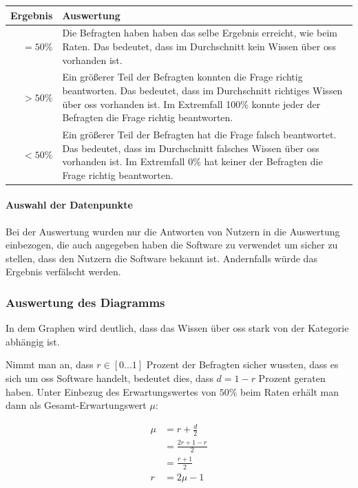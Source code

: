 \documentclass[a4paper]{article}
\begin{document}
                    \begin{tabularx}{\textwidth}{rX}
                        \textbf{Ergebnis} & \textbf{Auswertung} \\\hline
                        $= 50 \%$ & Die Befragten haben haben das selbe Ergebnis erreicht, wie beim Raten. Das bedeutet, dass im Durchschnitt kein Wissen über \gls{oss} vorhanden ist.\\
                        $> 50 \%$ & Ein größerer Teil der Befragten konnten die Frage richtig beantworten. Das bedeutet, dass im Durchschnitt richtiges Wissen über \gls{oss} vorhanden ist. Im Extremfall 100\% konnte jeder der Befragten die Frage richtig beantworten.\\
                        $< 50 \%$ & Ein größerer Teil der Befragten hat die Frage falsch beantwortet. Das bedeutet, dass im Durchschnitt falsches Wissen über \gls{oss} vorhanden ist. Im Extremfall 0\% hat keiner der Befragten die Frage richtig beantworten.  
                    \end{tabularx}
            
                \paragraph{Auswahl der Datenpunkte}
                    Bei der Auswertung wurden nur die Antworten von Nutzern in die Auswertung einbezogen, die auch angegeben haben die Software zu verwendet um sicher zu stellen, dass den Nutzern die Software bekannt ist. Andernfalls würde das Ergebnis verfälscht werden.
                    
            \subsubsection{Auswertung des Diagramms}\label{section:knowledge_analysis}
                In dem Graphen wird deutlich, dass das Wissen über \gls{oss} stark von der Kategorie abhängig ist. %
            
                Nimmt man an, dass $r \in \left[0...1\right]$ Prozent der Befragten sicher wussten, dass es sich um \gls{oss} Software handelt, bedeutet dies, dass $d = 1 - r$ Prozent geraten haben. Unter Einbezug des Erwartungswertes von $50 \%$ beim Raten erhält man dann als Gesamt-Erwartungswert $\mu$:
            
                \begin{equation}
                \begin{split}
                    \mu &= r + \frac{d}{2} \\
                        &= \frac{2r + 1 - r}{2} \\
                        &= \frac{r + 1}{2} \\
                    r   &= 2\mu - 1
                \end{split}
                \end{equation}
            
\end{document}
